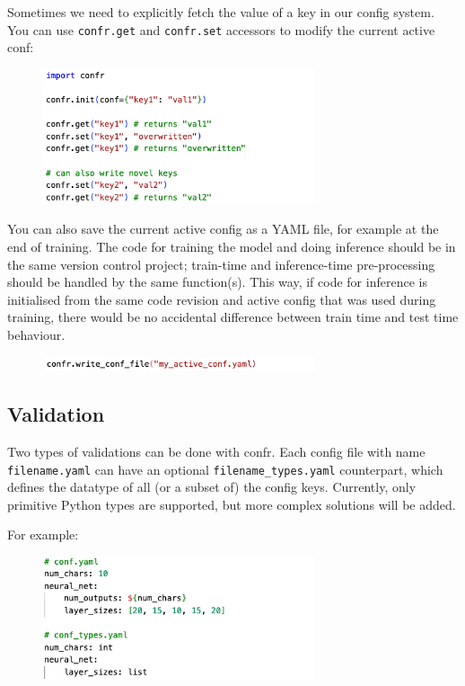 \documentclass{itatnew}
\begin{document}
Sometimes we need to explicitly fetch the value of a key in our config system. You can use \texttt{confr.get} and \texttt{confr.set} accessors to modify the current active conf:

\begin{figure}[H]
    \centering
    \includegraphics[width=8cm]{c14.png}
\end{figure}

You can also save the current active config as a YAML file, for example at the end of training.
The code for training the model and doing inference should be in the same version control project; train-time and inference-time pre-processing should be handled by the same function(s).
This way, if code for inference is initialised from the same code revision and active config that was used during training, there would be no accidental difference between train time and test time behaviour.

\begin{figure}[H]
    \centering
    \includegraphics[width=8cm]{c15.png}
\end{figure}

\subsection{Validation}

Two types of validations can be done with confr. Each config file with name \texttt{filename.yaml} can have an optional \texttt{filename_types.yaml} counterpart, which defines the datatype of all (or a subset of) the config keys. Currently, only primitive Python types are supported, but more complex solutions will be added.

For example:

\begin{figure}[H]
    \centering
    \includegraphics[width=8cm]{c16.png}
\end{figure}
\end{document}
